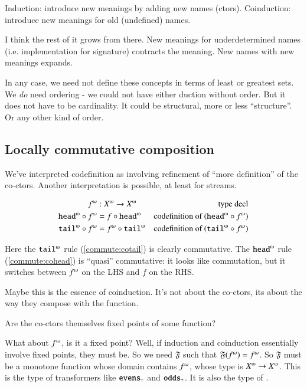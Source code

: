 Induction: introduce new meanings by adding new names (ctors).
Coinduction: introduce new meanings for old (undefined) names.

I think the rest of it grows from there. New meanings for
underdetermined names (i.e. implementation for signature) contracts
the meaning. New names with new meanings expands.

In any case, we need not define these concepts in terms of least or
greatest sets. We \textit{do} need ordering - we could not have either
duction without order. But it does not have to be cardinality. It
could be structural, more or less ``structure''. Or any other kind of
order.

\subsection{Locally commutative composition}

We've interpreted codefinition as involving refinement of ``more
definition'' of the co-ctors. Another interpretation is possible, at
least for streams.

\begin{align}
  \Lift{f}{\omega} &: {\colist{X}\func\colist{X}} & \text{type decl} \\
  \cohead\circ\Lift{f}{\omega} & = f\circ\cohead
  & \text{codefinition of}\ (\cohead\circ\Lift{f}{\omega})
  \label{commute:cohead}\\
  \cotail\circ\Lift{f}{\omega} & = \Lift{f}{\omega}\circ \cotail &
  \text{codefinition of}\ (\cotail\circ\Lift{f}{\omega})
  \label{commute:cotail}
\end{align}

Here the \(\cotail\) rule (\ref{commute:cotail}) is clearly commutative.
The \(\cohead\) rule (\ref{commute:cohead}) is ``quasi'' commutative:
it looks like commutation, but it switches between
\(f^{\omega}\) on the LHS and \(f\) on the RHS.

Maybe this is the essence of coinduction. It's not about the co-ctors,
its about the way they compose with the function.

Are the co-ctors themselves fixed points of some function?

What about \(f^{\omega}\), is it a fixed point? Well, if
induction and coinduction essentially involve fixed points, they must
be. So we need \(\mathfrak{F}\) such that
\(\mathfrak{F}(f^{\omega}) = f^{\omega}\). So
\(\mathfrak{F}\) must be a monotone function whose domain contains
\(f^{\omega}\), whose type is \(\colist{X}\func\colist{X}\).
This is the type of transformers like \(\texttt{\upshape evens}_{\scriptscriptstyle\top}\) and
\(\texttt{\upshape odds}_{\scriptscriptstyle\top}\). It is also the type of \cotail.

